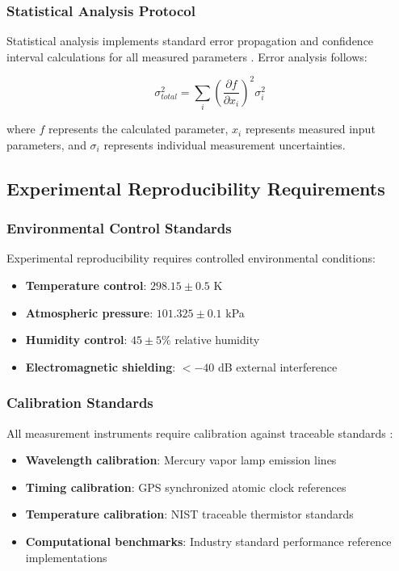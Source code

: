 \subsubsection{Statistical Analysis Protocol}

Statistical analysis implements standard error propagation and confidence interval calculations for all measured parameters \cite{sears2003university}. Error analysis follows:

\begin{equation}
\sigma_{total}^2 = \sum_i \left(\frac{\partial f}{\partial x_i}\right)^2 \sigma_i^2
\end{equation}

where $f$ represents the calculated parameter, $x_i$ represents measured input parameters, and $\sigma_i$ represents individual measurement uncertainties.

\subsection{Experimental Reproducibility Requirements}

\subsubsection{Environmental Control Standards}

Experimental reproducibility requires controlled environmental conditions:

\begin{itemize}
\item \textbf{Temperature control}: $298.15 \pm 0.5$ K
\item \textbf{Atmospheric pressure}: $101.325 \pm 0.1$ kPa  
\item \textbf{Humidity control}: $45 \pm 5\%$ relative humidity
\item \textbf{Electromagnetic shielding}: $< -40$ dB external interference
\end{itemize}

\subsubsection{Calibration Standards}

All measurement instruments require calibration against traceable standards \cite{ludlow2015optical}:

\begin{itemize}
\item \textbf{Wavelength calibration}: Mercury vapor lamp emission lines
\item \textbf{Timing calibration}: GPS synchronized atomic clock references
\item \textbf{Temperature calibration}: NIST traceable thermistor standards
\item \textbf{Computational benchmarks}: Industry standard performance reference implementations
\end{itemize}

